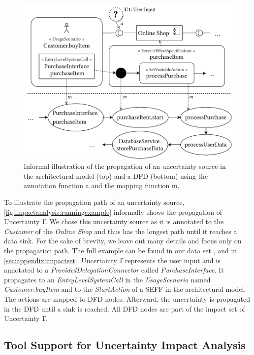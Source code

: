 \begin{figure}
    \centering
    \includegraphics[width=0.9\linewidth]{figures/chapter6/impact-runningexample.pdf}
    \caption{Informal illustration of the propagation of an uncertainty source in the architectural model (top) and a \acf*{DFD} (bottom) using the annotation function a and the mapping function m.}
    \label{fig:impactanalysis:runningexample}
\end{figure}

To illustrate the propagation path of an uncertainty source, \autoref{fig:impactanalysis:runningexample} informally shows the propagation of Uncertainty \U{1}.
We chose this uncertainty source as it is annotated to the \emph{Customer} of the \emph{Online Shop} and thus has the longest path until it reaches a data sink.
For the sake of brevity, we leave out many details and focus only on the propagation path.
The full example can be found in our data set \cite{dataset}, and in \autoref{sec:appendix:impactset}.
Uncertainty \U{1} represents the user input and is annotated to a \emph{ProvidedDelegationConnector} called \emph{PurchaseInterface}.
It propagates to an \emph{EntryLevelSystemCall} in the \emph{UsageScenario} named \emph{Customer.buyItem} and to the \emph{StartAction} of a \ac{SEFF} in the architectural model.
The actions are mapped to \ac{DFD} nodes.
Afterward, the uncertainty is propagated in the \ac{DFD} until a sink is reached.
All \ac{DFD} nodes are part of the impact set of Uncertainty \U{1}.  


\subsection{Tool Support for Uncertainty Impact Analysis}

